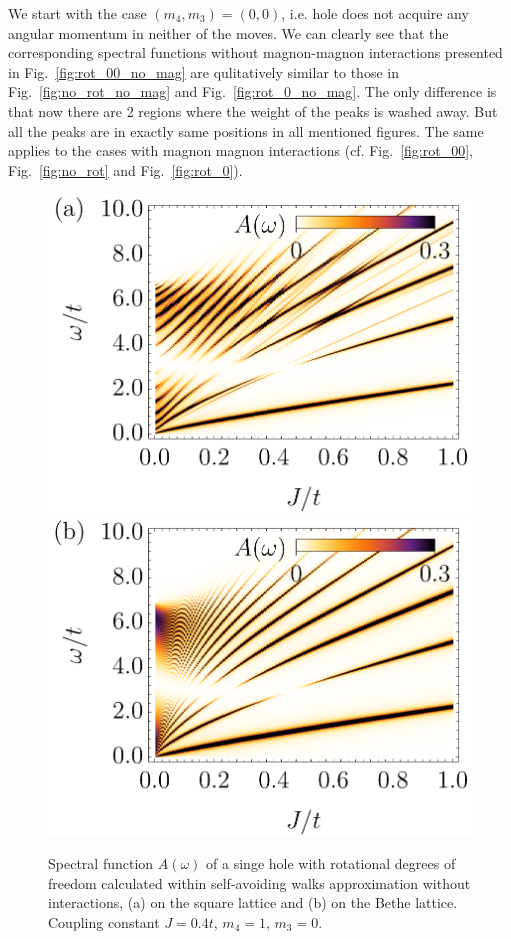 \documentclass[%
 reprint,
 amsmath,amssymb,
 aps,
prb,
floatfix,
]{revtex4-1}
\begin{document}
We start with the case $(m_4,m_3) = (0,0)$, i.e. hole does not acquire any angular momentum in neither of the moves. We can clearly see that the corresponding spectral functions without magnon-magnon interactions presented in Fig.~\ref{fig:rot_00_no_mag} are qulitatively similar to those in Fig.~\ref{fig:no_rot_no_mag} and Fig.~\ref{fig:rot_0_no_mag}. The only difference is that now there are 2 regions where the weight of the peaks is washed away. But all the peaks are in exactly same positions in all mentioned figures. The same applies to the cases with magnon magnon interactions (cf. Fig.~\ref{fig:rot_00}, Fig.~\ref{fig:no_rot} and Fig.~\ref{fig:rot_0}).

\begin{figure}[ht!]
	\includegraphics[width=0.49\columnwidth]
	{./figures/square/[1, 0]_noint.png}
	\includegraphics[width=0.49\columnwidth]
	{./figures/bethe/[1, 0]_noint.png}
	\caption{
		Spectral function $A(\omega)$ of a singe hole with rotational degrees of freedom calculated within self-avoiding walks approximation without interactions, (a) on the square lattice and (b) on the Bethe lattice. Coupling constant $J=0.4t$, $m_4 = 1$, $m_3 = 0$.
	}\label{fig:rot_10_no_mag}
\end{figure}
\end{document}
